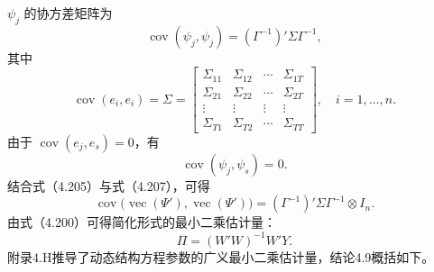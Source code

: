 $\psi_j$ 的协方差矩阵为
\begin{equation}
\operatorname{cov}(\psi_j,\psi_j)=(\Gamma^{-1})'\Sigma\Gamma^{-1},\tag{4.205}
\end{equation}
其中
\begin{equation}
\operatorname{cov}(e_i,e_i)=\Sigma=
\begin{bmatrix}
\Sigma_{11}&\Sigma_{12}&\cdots&\Sigma_{1T}\\
\Sigma_{21}&\Sigma_{22}&\cdots&\Sigma_{2T}\\
\vdots&\vdots&\vdots&\vdots\\
\Sigma_{T1}&\Sigma_{T2}&\cdots&\Sigma_{TT}
\end{bmatrix},\quad i=1,\ldots,n.\tag{4.206}
\end{equation}
由于 $\operatorname{cov}(e_j,e_s)=0$，有
\begin{equation}
\operatorname{cov}(\psi_j,\psi_s)=0.\tag{4.207}
\end{equation}
结合式（4.205）与式（4.207），可得
\begin{equation}
\operatorname{cov}\bigl(\operatorname{vec}(\Psi'),\operatorname{vec}(\Psi')\bigr)
=(\Gamma^{-1})'\Sigma\Gamma^{-1}\otimes I_n.\tag{4.208}
\end{equation}
由式（4.200）可得简化形式的最小二乘估计量：
\begin{equation}
\Pi=(W'W)^{-1}W'Y.\tag{4.209}
\end{equation}
附录4.H推导了动态结构方程参数的广义最小二乘估计量，结论4.9概括如下。

